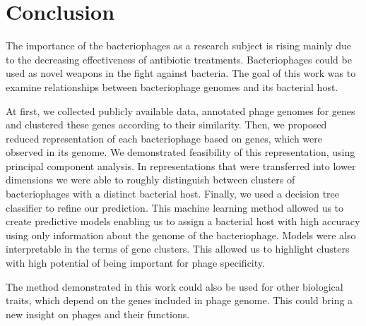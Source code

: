 \chapter*{Conclusion} %

The importance of the bacteriophages as a research subject is rising mainly due to the decreasing effectiveness of antibiotic treatments.
Bacteriophages could be used as novel weapons in the fight against bacteria.
The goal of this work was to examine relationships between bacteriophage genomes and its bacterial host.


At first, we collected publicly available data, annotated phage genomes for genes and clustered these genes according to their similarity.
Then, we proposed reduced representation of each bacteriophage based on genes, which were observed in its genome.
We demonstrated feasibility of this representation, using principal component analysis.
In representations that were transferred into lower dimensions we were able to roughly distinguish between clusters of bacteriophages with a distinct bacterial host.
Finally, we used a decision tree classifier to refine our prediction.
This machine learning method allowed us to create predictive models enabling us to assign a bacterial host with high accuracy using only information about the genome of the bacteriophage.
Models were also interpretable in the terms of gene clusters.
This allowed us to highlight clusters with high potential of being important for phage specificity.

The method demonstrated in this work could also be used for other biological traits, which depend on the genes included in phage genome.
This could bring a new insight on phages and their functions.
